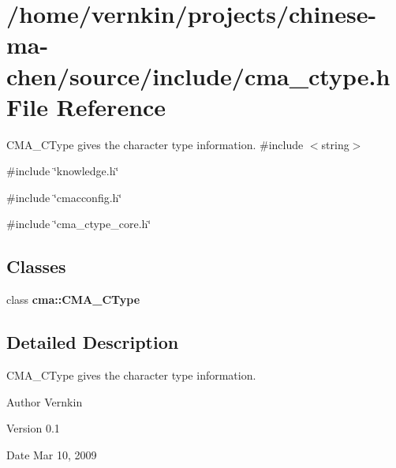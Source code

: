 \section{/home/vernkin/projects/chinese-\/ma-\/chen/source/include/cma\_\-ctype.h File Reference}
\label{cma__ctype_8h}


CMA\_\-CType gives the character type information.  
{\ttfamily \#include $<$string$>$}\par
{\ttfamily \#include \char`\"{}knowledge.h\char`\"{}}\par
{\ttfamily \#include \char`\"{}cmacconfig.h\char`\"{}}\par
{\ttfamily \#include \char`\"{}cma\_\-ctype\_\-core.h\char`\"{}}\par
\subsection*{Classes}
\begin{DoxyCompactItemize}
\item 
class {\bf cma::CMA\_\-CType}
\end{DoxyCompactItemize}


\subsection{Detailed Description}
CMA\_\-CType gives the character type information. \begin{DoxyAuthor}{Author}
Vernkin 
\end{DoxyAuthor}
\begin{DoxyVersion}{Version}
0.1 
\end{DoxyVersion}
\begin{DoxyDate}{Date}
Mar 10, 2009 
\end{DoxyDate}
